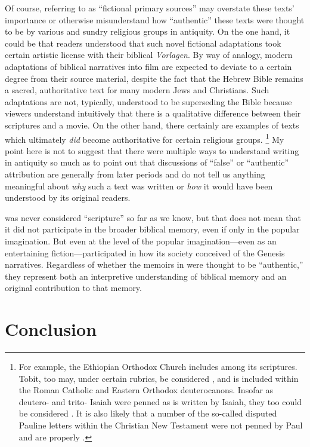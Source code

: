 Of course, referring to \psy as ``fictional primary sources'' may overstate these texts' importance or otherwise misunderstand how ``authentic'' these texts were thought to be by various and sundry religious groups in antiquity. On the one hand, it could be that readers understood that such novel fictional adaptations took certain artistic license with their biblical \emph{Vorlagen}. By way of analogy, modern adaptations of biblical narratives into film are expected to deviate to a certain degree from their source material, despite the fact that the Hebrew Bible remains a sacred, authoritative text for many modern Jews and Christians. Such adaptations are not, typically, understood to be superseding the Bible because viewers understand intuitively that there is a qualitative difference between their scriptures and a movie. On the other hand, there certainly are examples of \psgraphical texts which ultimately \emph{did} become authoritative for certain religious groups.%
    \footnote{For example, the Ethiopian Orthodox Church includes \firstenoch among its scriptures. Tobit, too may, under certain rubrics, be considered \psa, and is included within the Roman Catholic and Eastern Orthodox deuterocanons. Insofar as deutero- and trito- Isaiah were penned as is written by Isaiah, they too could be considered \psa. It is also likely that a number of the so-called disputed Pauline letters within the Christian New Testament were not penned by Paul and are properly \psgraphical.}
My point here is not to suggest that there were multiple ways to understand \psgraphical writing in antiquity so much as to point out that discussions of ``false'' or ``authentic'' attribution are generally from later periods and do not tell us anything meaningful about \emph{why} such a text was written or \emph{how} it would have been understood by its original readers.

\GA was never considered ``scripture'' so far as we know, but that does not mean that it did not participate in the broader biblical memory, even if only in the popular imagination. But even at the level of the popular imagination---even as an entertaining fiction---\ga participated in how its society conceived of the Genesis narratives. Regardless of whether the memoirs in \ga were thought to be ``authentic,'' they represent both an interpretive understanding of biblical memory and an original contribution to that memory.

\section{Conclusion}

